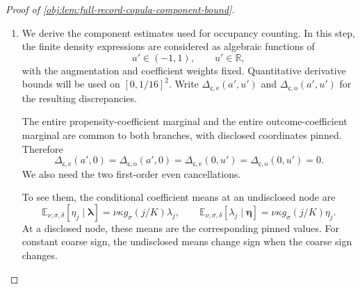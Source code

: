 \documentclass[11pt]{article}
\begin{document}
\begin{proof}[Proof of \cref{obj:lem:full-record-copula-component-bound}]
\begin{enumerate}
\[\begin{aligned}
 \bigl(1+\mathfrak o_{\mathsf c_*}\mathsf D_{\mathrm o}(\mathscr U)\bigr)\\
 &\le
 \exp\!\left(
 \mathsf T_{\mathrm o}(\mathscr U)
 +\mathfrak o_{\mathsf c_*}\mathsf D_{\mathrm o}(\mathscr U)\right).
\end{aligned}
\]
Applying this to each \(\mathscr C_j(\omega)\) proves
\[
1+\chi^2(P_1(\omega)\Vert Q(\omega))
 \le\exp(\mathcal B(\omega)).
\]
Finally, \(\mathsf f_0\) and \(\mathsf f_{\mathrm{av}}\) are strictly positive on the finite label alphabet. Hence
\[
Q(\omega)\ll P_0(\omega),
\qquad
P_1(\omega)\ll Q(\omega).
\]
All these comparisons are conditional on the full triple \(\omega\).

\item
We derive the component estimates used for occupancy counting. In this step, the finite density expressions are considered as algebraic functions of
\[
a'\in(-1,1),\qquad u'\in\mathbb R,
\]
with the augmentation and coefficient weights fixed. Quantitative derivative bounds will be used on
\([0,1/16]^2\). Write \(\Delta_{\mathsf c,\mathrm e}(a',u')\) and
\(\Delta_{\mathsf c,\mathrm o}(a',u')\) for the resulting discrepancies.

The entire propensity-coefficient marginal and the entire outcome-coefficient marginal are common to both branches, with disclosed coordinates pinned. Therefore
\[
\Delta_{\mathsf c,\mathrm e}(a',0)
 =\Delta_{\mathsf c,\mathrm o}(a',0)
 =\Delta_{\mathsf c,\mathrm e}(0,u')
 =\Delta_{\mathsf c,\mathrm o}(0,u')=0.
\]
We also need the two first-order even cancellations.

To see them, the conditional coefficient means at an undisclosed node are
\[
\mathbb E_{\nu,\sigma,\delta}
 [\eta_j\mid\boldsymbol\lambda]
 =\nu\kappa g_\sigma(j/K)\lambda_j,
\qquad
\mathbb E_{\nu,\sigma,\delta}
 [\lambda_j\mid\boldsymbol\eta]
 =\nu\kappa g_\sigma(j/K)\eta_j.
\]
At a disclosed node, these means are the corresponding pinned values. For constant coarse sign, the undisclosed means change sign when the coarse sign changes.


\end{enumerate}
\end{proof}
\end{document}
